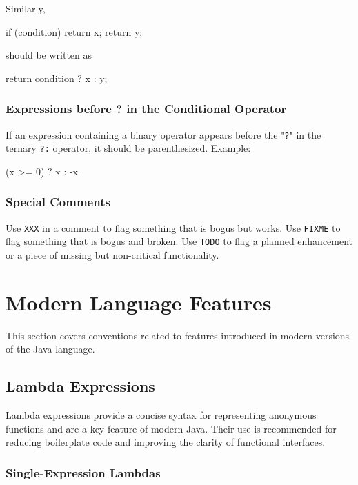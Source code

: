 \documentclass{article}
\begin{document}
Similarly,

\begin{snippet}
if (condition) {
    return x;
}
return y;
\end{snippet}

should be written as

\begin{snippet}
return condition ? x : y;
\end{snippet}

\subsubsection{Expressions before ? in the Conditional Operator}

If an expression containing a binary operator appears before the "\texttt{?}" in the ternary
\texttt{?:} operator, it should be parenthesized. Example:

\begin{snippet}
(x >= 0) ? x : -x
\end{snippet}

\subsubsection{Special Comments}

Use \texttt{XXX} in a comment to flag something that is bogus but works. Use \texttt{FIXME} to flag
something that is bogus and broken. Use \texttt{TODO} to flag a planned enhancement or a piece of
missing but non-critical functionality.

\section{Modern Language Features}

This section covers conventions related to features introduced in modern versions of the Java
language.

\subsection{Lambda Expressions}

Lambda expressions provide a concise syntax for representing anonymous functions and are a key
feature of modern Java. Their use is recommended for reducing boilerplate code and improving the
clarity of functional interfaces.

\subsubsection{Single-Expression Lambdas}
\end{document}
